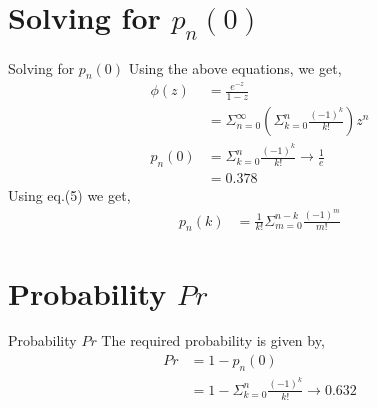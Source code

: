 \documentclass{beamer}
\providecommand{\brak}[1]{\ensuremath{\left(#1\right)}}
\begin{document}
\section{Solving for $p_n(0)$}
\begin{frame}{Solving for $p_n(0)$}
Using the above equations, we get,
	\begin{align}
	\phi(z) &= \frac{e^{-z}}{1-z} \\
	        &= \Sigma^\infty_{n=0}\brak{\Sigma^n_{k=0}\frac{(-1)^k}{k!}}z^n \\
	p_n(0) &= \Sigma^n_{k=0}\frac{(-1)^k}{k!} \rightarrow \frac{1}{e} \\
	       &= 0.378
	\end{align} 
	Using eq.(5) we get,
	\begin{align}
	         p_n(k) &= \frac{1}{k!}\Sigma^{n-k}_{m=0}\frac{(-1)^m}{m!}
	\end{align}
\end{frame}


\section{Probability $Pr$}
\begin{frame}{Probability $Pr$}
The required probability is given by,
	\begin{align}
	   Pr &= 1-p_n(0) \\
	   &= 1-\Sigma^n_{k=0}\frac{(-1)^k}{k!} \rightarrow 0.632	
	\end{align}
\end{frame}
\end{document}

